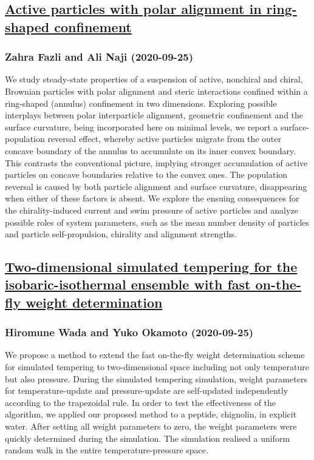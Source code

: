 \subsection*{\href{http://arxiv.org/abs/2009.12162v1}{Active particles with polar alignment in ring-shaped confinement}}
\subsubsection*{Zahra Fazli and Ali Naji (2020-09-25)}
We study steady-state properties of a suspension of active, nonchiral and
chiral, Brownian particles with polar alignment and steric interactions
confined within a ring-shaped (annulus) confinement in two dimensions.
Exploring possible interplays between polar interparticle alignment, geometric
confinement and the surface curvature, being incorporated here on minimal
levels, we report a surface-population reversal effect, whereby active
particles migrate from the outer concave boundary of the annulus to accumulate
on its inner convex boundary. This contrasts the conventional picture, implying
stronger accumulation of active particles on concave boundaries relative to the
convex ones. The population reversal is caused by both particle alignment and
surface curvature, disappearing when either of these factors is absent. We
explore the ensuing consequences for the chirality-induced current and swim
pressure of active particles and analyze possible roles of system parameters,
such as the mean number density of particles and particle self-propulsion,
chirality and alignment strengths.

\subsection*{\href{http://arxiv.org/abs/2009.12151v1}{Two-dimensional simulated tempering for the isobaric-isothermal ensemble  with fast on-the-fly weight determination}}
\subsubsection*{Hiromune Wada and Yuko Okamoto (2020-09-25)}
We propose a method to extend the fast on-the-fly weight determination scheme
for simulated tempering to two-dimensional space including not only temperature
but also pressure. During the simulated tempering simulation, weight parameters
for temperature-update and pressure-update are self-updated independently
according to the trapezoidal rule. In order to test the effectiveness of the
algorithm, we applied our proposed method to a peptide, chignolin, in explicit
water. After setting all weight parameters to zero, the weight parameters were
quickly determined during the simulation. The simulation realised a uniform
random walk in the entire temperature-pressure space.

